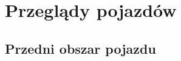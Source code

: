 \newcommand{\envalias}[2]{\newenvironment{#1}{\begin{#2}}{\end{#2}}}
\envalias{itemizeTriangle}{itemize}
\envalias{itemizeArrow}{itemize}
\envalias{itemizeTick}{itemize}

\newcommand{\genericItem}[1]{\item[#1]}
\newcommand{\itemTriangle}{\genericItem{$\blacktriangleright$}}
\newcommand{\itemArrow}{\genericItem{\textrptr}}
\newcommand{\itemTick}{\genericItem{$\checkmark$}}




\section{Przeglądy pojazdów}

\subsection{Przedni obszar pojazdu}


